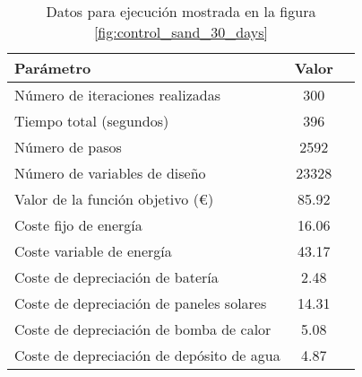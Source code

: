 \begin{table}[ht]
	\centering
	\caption{Datos para ejecución mostrada en la figura \ref{fig:control_sand_30_days}}
	\label{tab:control_sand_30_days}
	\begin{tabular}{@{}lcc@{}}
		\toprule
		Parámetro                                 & Valor \\
		\midrule
		Número de iteraciones realizadas          & 300   \\
		Tiempo total (segundos)                   & 396   \\
		Número de pasos                           & 2592  \\
		Número de variables de diseño             & 23328 \\
		\midrule
		Valor de la función objetivo (€)          & 85.92 \\
		\midrule
		Coste fijo de energía                     & 16.06 \\
		Coste variable de energía                 & 43.17 \\
		Coste de depreciación de batería          & 2.48  \\
		Coste de depreciación de paneles solares  & 14.31 \\
		Coste de depreciación de bomba de calor   & 5.08  \\
		Coste de depreciación de depósito de agua & 4.87  \\
		\bottomrule
	\end{tabular}
\end{table}
